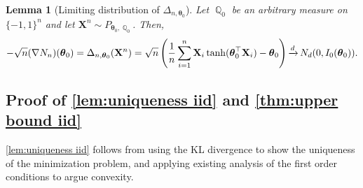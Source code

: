 \documentclass[preprint,reqno]{imsart}
\newtheorem{lemma}[thm]{Lemma}
\newcommand{\ttheta}{\boldsymbol{\theta}}
\DeclareMathOperator{\xd}{\xrightarrow{\mathnormal d}}
\DeclareMathOperator{\QQ}{\mathbb{Q}}
\newcommand{\X}{\mathbf{X}}
\DeclareMathOperator{\sumin}{\sum_{\mathnormal i=1}^{\mathnormal n}}
\begin{document}
\begin{lemma}[Limiting distribution of $\Delta_{n,\ttheta_0}$]\label{lem: CLT high}
Let $\QQ_0$ be an arbitrary measure on $\{-1, 1\}^n$ and let $\X^n \sim P_{\ttheta_0,\QQ_{0}}$.
Then,
\begin{align}\label{eq:N_n expansion}
    -\sqrt{n}(\nabla N_n) (\ttheta_0) = \Delta_{n,\ttheta_0}(\X^n) = \sqrt{n} \left(\frac{1}{n} \sumin \X_i \tanh(\ttheta_0^\top \X_i) - \ttheta_0 \right) \xd N_d(0, I_0(\ttheta_0)).
\end{align}
\end{lemma}



\subsection{Proof of \cref{lem:uniqueness iid} and \cref{thm:upper bound iid}}\label{sec:proof iid}
\cref{lem:uniqueness iid} follows from using the KL divergence to show the uniqueness of the minimization problem, and applying existing analysis of the first order conditions to argue convexity.
\end{document}
